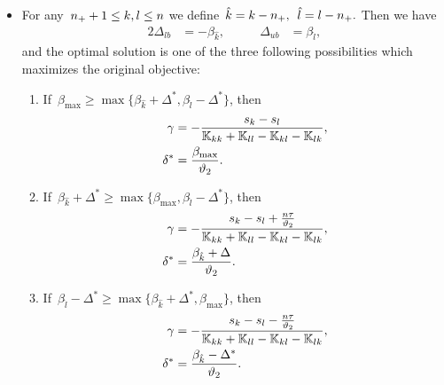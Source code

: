 \begin{theorem}
\begin{itemize}
    \item For any~$n_{+} + 1\le k,l \le n$ we define~$\hat{k} = k - n_{+},$~$\hat{l} = l - n_{+}.$ Then we have
    \begin{alignat*}{2}
      \Delta_{lb} & = - \beta_{\hat{k}}, & \qquad
      \Delta_{ub} & = \beta_{\hat{l}},
    \end{alignat*}
    and the optimal solution is one of the three following possibilities which maximizes the original objective:
    \begin{enumerate}
      \item If~$\beta_{\max} \geq \max\{\beta_{\hat{k}} + \Delta^{*}, \beta_{\hat{l}} - \Delta^{*}\}$, then
      \begin{align*}
        \gamma     & = -\frac{s_k - s_l}{\mathbb{K}_{kk} + \mathbb{K}_{ll} - \mathbb{K}_{kl} - \mathbb{K}_{lk}}, \\
        \delta^{*} & = \frac{\beta_{\max}}{\vartheta_2}.
      \end{align*}
      \item If~$\beta_{\hat{k}} + \Delta^{*} \geq \max\{\beta_{\max} , \beta_{\hat{l}} - \Delta^{*}\}$, then
      \begin{align*}
        \gamma     & = -\frac{s_k - s_l + \frac{n\tau}{\vartheta_2}}{\mathbb{K}_{kk} + \mathbb{K}_{ll} - \mathbb{K}_{kl} - \mathbb{K}_{lk}}, \\
        \delta^{*} & = \frac{\beta_{\hat{k}} + \Delta}{\vartheta_2}.
      \end{align*}
      \item If~$\beta_{\hat{l}} - \Delta^{*} \geq \max\{\beta_{\hat{k}} + \Delta^{*}, \beta_{\max}\}$, then
      \begin{align*}
        \gamma     & = -\frac{s_k - s_l - \frac{n\tau}{\vartheta_2}}{\mathbb{K}_{kk} + \mathbb{K}_{ll} - \mathbb{K}_{kl} - \mathbb{K}_{lk}}, \\
        \delta^{*} & = \frac{\beta_{\hat{k}} - \Delta^{*}}{\vartheta_2}.
      \end{align*}
    \end{enumerate}
  \end{itemize}
\end{theorem}